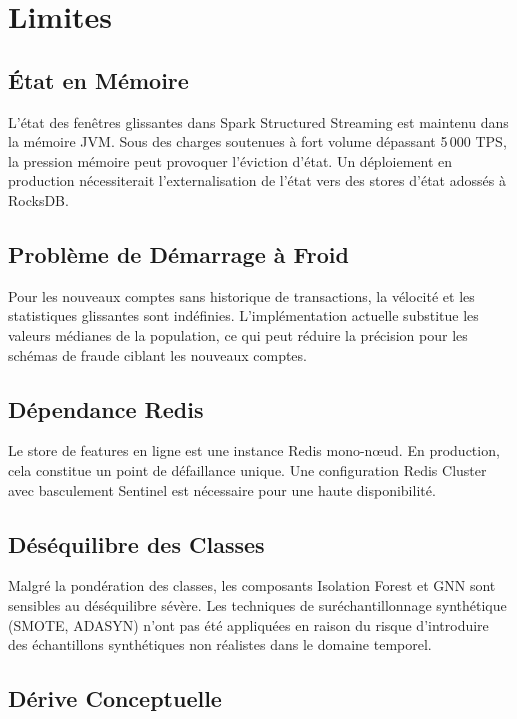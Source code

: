 \documentclass[12pt,a4paper,oneside]{book}
\theoremstyle{definition}
\theoremstyle{plain}
\begin{document}
\section{Limites}

\subsection{État en Mémoire}

L'état des fenêtres glissantes dans Spark Structured Streaming est maintenu dans la mémoire JVM. Sous des charges soutenues à fort volume dépassant 5\,000 TPS, la pression mémoire peut provoquer l'éviction d'état. Un déploiement en production nécessiterait l'externalisation de l'état vers des stores d'état adossés à RocksDB.

\subsection{Problème de Démarrage à Froid}

Pour les nouveaux comptes sans historique de transactions, la vélocité et les statistiques glissantes sont indéfinies. L'implémentation actuelle substitue les valeurs médianes de la population, ce qui peut réduire la précision pour les schémas de fraude ciblant les nouveaux comptes.

\subsection{Dépendance Redis}

Le store de features en ligne est une instance Redis mono-nœud. En production, cela constitue un point de défaillance unique. Une configuration Redis Cluster avec basculement Sentinel est nécessaire pour une haute disponibilité.

\subsection{Déséquilibre des Classes}

Malgré la pondération des classes, les composants Isolation Forest et GNN sont sensibles au déséquilibre sévère. Les techniques de suréchantillonnage synthétique (SMOTE, ADASYN) n'ont pas été appliquées en raison du risque d'introduire des échantillons synthétiques non réalistes dans le domaine temporel.

\subsection{Dérive Conceptuelle}
\end{document}
